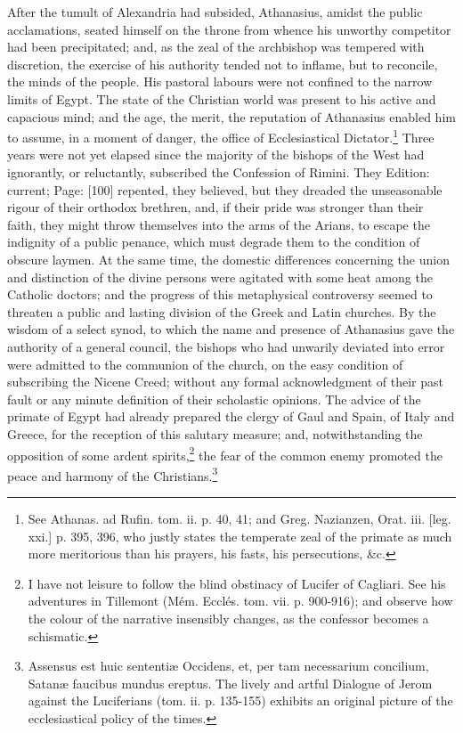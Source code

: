 After the tumult of Alexandria had subsided, Athanasius, amidst the public acclamations, seated himself on the throne from whence his unworthy competitor had been precipitated; and, as the zeal of the archbishop was tempered with discretion, the exercise of his authority tended not to inflame, but to reconcile, the minds of the people. His pastoral labours were not confined to the narrow limits of Egypt. The state of the Christian world was present to his active and capacious mind; and the age, the merit, the reputation of Athanasius enabled him to assume, in a moment of danger, the office of Ecclesiastical Dictator.\footnote{See Athanas. ad Rufin. tom. ii. p. 40, 41; and Greg. Nazianzen, Orat. iii. [leg. xxi.] p. 395, 396, who justly states the temperate zeal of the primate as much more meritorious than his prayers, his fasts, his persecutions, \&c.} Three years were not yet elapsed since the majority of the bishops of the West had ignorantly, or reluctantly, subscribed the Confession of Rimini. They Edition: current; Page: [100] repented, they believed, but they dreaded the unseasonable rigour of their orthodox brethren, and, if their pride was stronger than their faith, they might throw themselves into the arms of the Arians, to escape the indignity of a public penance, which must degrade them to the condition of obscure laymen. At the same time, the domestic differences concerning the union and distinction of the divine persons were agitated with some heat among the Catholic doctors; and the progress of this metaphysical controversy seemed to threaten a public and lasting division of the Greek and Latin churches. By the wisdom of a select synod, to which the name and presence of Athanasius gave the authority of a general council, the bishops who had unwarily deviated into error were admitted to the communion of the church, on the easy condition of subscribing the Nicene Creed; without any formal acknowledgment of their past fault or any minute definition of their scholastic opinions. The advice of the primate of Egypt had already prepared the clergy of Gaul and Spain, of Italy and Greece, for the reception of this salutary measure; and, notwithstanding the opposition of some ardent spirits,\footnote{I have not leisure to follow the blind obstinacy of Lucifer of Cagliari. See his adventures in Tillemont (Mém. Ecclés. tom. vii. p. 900-916); and observe how the colour of the narrative insensibly changes, as the confessor becomes a schismatic.} the fear of the common enemy promoted the peace and harmony of the Christians.\footnote{Assensus est huic sententiæ Occidens, et, per tam necessarium concilium, Satanæ faucibus mundus ereptus. The lively and artful Dialogue of Jerom against the Luciferians (tom. ii. p. 135-155) exhibits an original picture of the ecclesiastical policy of the times.}

